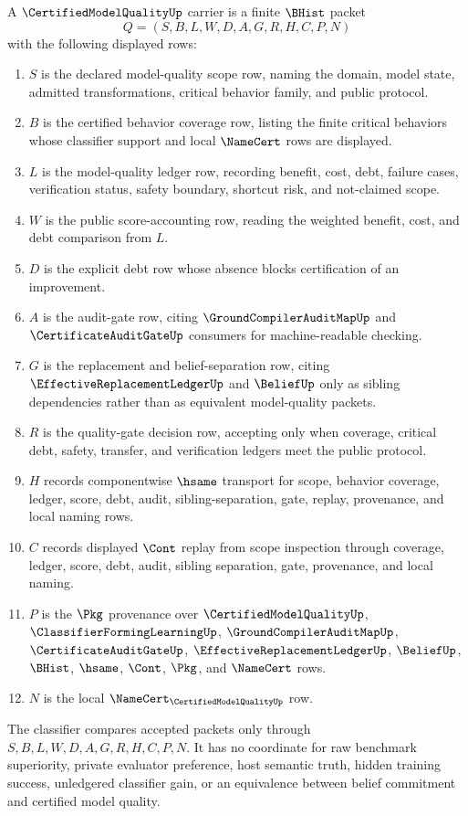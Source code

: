 \begin{definition}
\label{def:certified-model-quality-carrier}
A $\CertifiedModelQualityUp$ carrier is a finite $\BHist$ packet
$$
Q=(S,B,L,W,D,A,G,R,H,C,P,N)
$$
with the following displayed rows:
\begin{enumerate}
\item $S$ is the declared model-quality scope row, naming the domain, model state, admitted transformations, critical behavior family, and public protocol.
\item $B$ is the certified behavior coverage row, listing the finite critical behaviors whose classifier support and local $\NameCert$ rows are displayed.
\item $L$ is the model-quality ledger row, recording benefit, cost, debt, failure cases, verification status, safety boundary, shortcut risk, and not-claimed scope.
\item $W$ is the public score-accounting row, reading the weighted benefit, cost, and debt comparison from $L$.
\item $D$ is the explicit debt row whose absence blocks certification of an improvement.
\item $A$ is the audit-gate row, citing $\GroundCompilerAuditMapUp$ and $\CertificateAuditGateUp$ consumers for machine-readable checking.
\item $G$ is the replacement and belief-separation row, citing $\EffectiveReplacementLedgerUp$ and $\BeliefUp$ only as sibling dependencies rather than as equivalent model-quality packets.
\item $R$ is the quality-gate decision row, accepting only when coverage, critical debt, safety, transfer, and verification ledgers meet the public protocol.
\item $H$ records componentwise $\hsame$ transport for scope, behavior coverage, ledger, score, debt, audit, sibling-separation, gate, replay, provenance, and local naming rows.
\item $C$ records displayed $\Cont$ replay from scope inspection through coverage, ledger, score, debt, audit, sibling separation, gate, provenance, and local naming.
\item $P$ is the $\Pkg$ provenance over $\CertifiedModelQualityUp$, $\ClassifierFormingLearningUp$, $\GroundCompilerAuditMapUp$, $\CertificateAuditGateUp$, $\EffectiveReplacementLedgerUp$, $\BeliefUp$, $\BHist$, $\hsame$, $\Cont$, $\Pkg$, and $\NameCert$ rows.
\item $N$ is the local $\NameCert_{\CertifiedModelQualityUp}$ row.
\end{enumerate}
The classifier compares accepted packets only through $S,B,L,W,D,A,G,R,H,C,P,N$. It has no coordinate for raw benchmark superiority, private evaluator preference, host semantic truth, hidden training success, unledgered classifier gain, or an equivalence between belief commitment and certified model quality.
\end{definition}

